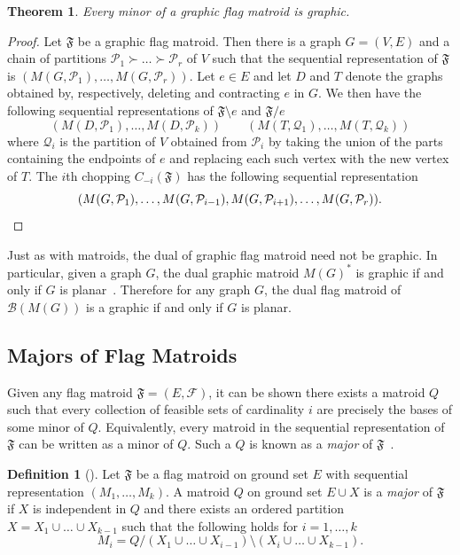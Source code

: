 \documentclass[12pt]{article}
\newtheorem{theorem}[thm]{Theorem}
\theoremstyle{definition}
\newtheorem{defn}[thm]{Definition}
\begin{document}
\begin{theorem}\label{thm: minors of graphic}
    Every minor of a graphic flag matroid is graphic. 
\end{theorem}
\begin{proof}
    Let $\mathfrak{F}$ be a graphic flag matroid. Then there is a graph $G = (V,E)$ and a chain of partitions $\mathcal{P}_1 \succ \dots \succ \mathcal{P}_r$ of $V$ such that the sequential representation of $\mathfrak{F}$ is $(M(G, \mathcal{P}_1), \dots, M(G, \mathcal{P}_r))$.
    Let $e \in E$ and let $D$ and $T$ denote the graphs obtained by, respectively, deleting and contracting $e$ in $G$.
    We then have the following sequential representations of $\mathfrak{F} \setminus e$ and $\mathfrak{F} / e$
    \[
        (M(D, \mathcal{P}_1), \dots, M(D, \mathcal{P}_k)) \qquad (M(T, \mathcal{Q}_1), \dots, M(T, \mathcal{Q}_k))
    \]
    where $\mathcal{Q}_i$ is the partition of $V$ obtained from $\mathcal{P}_i$ by taking the union of the parts containing the endpoints of $e$
    and replacing each such vertex with the new vertex of $T$.
    The $i$th chopping $C_{-i}(\mathfrak{F})$ has the following sequential representation
    \[
        (M(G, \mathcal{P}_1), \dots, M(G, \mathcal{P}_{i-1}), M(G, \mathcal{P}_{i+1}), \dots, M(G, \mathcal{P}_r)). \qedhere
    \]
\end{proof}


Just as with matroids, the dual of graphic flag matroid need not be graphic.
In particular, given a graph $G$, the dual graphic matroid $M(G)^*$ is graphic if and only if $G$ is planar~\cite{oxley}.
Therefore for any graph $G$, the dual flag matroid of $\mathcal{B}(M(G))$ is a graphic if and only if $G$ is planar.

\subsection{Majors of Flag Matroids}
Given any flag matroid $\mathfrak{F} = (E, \mathcal{F})$, it can be shown there exists a matroid $Q$ such that every collection of feasible sets of cardinality $i$ are precisely the bases of some minor of $Q$.
Equivalently, every matroid in the sequential representation of $\mathfrak{F}$ can be written as a minor of $Q$.
Such a $Q$ is known as a \emph{major} of $\mathfrak{F}$~\cite{kung1986strong}.

\begin{defn}[\cite{kung1986strong}]\label{defn: major}
    Let $\mathfrak{F}$ be a flag matroid on ground set $E$ with sequential representation $(M_1,\dots,M_k)$.
    A matroid $Q$ on ground set $E \cup X$ is a \emph{major} of $\mathfrak{F}$
    if $X$ is independent in $Q$ and there exists an ordered partition
    $X = X_1 \cup \dots \cup X_{k-1}$ such that the following holds for $i = 1,\dots,k$
    \[
        M_i = Q / (X_1 \cup \dots \cup X_{i-1}) \setminus (X_i \cup \dots \cup X_{k-1}).
    \]
\end{defn}
\end{document}
